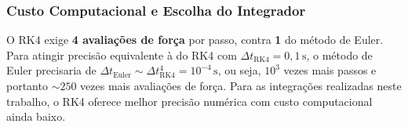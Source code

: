 \subsubsection{Custo Computacional e Escolha do Integrador}

O RK4 exige \textbf{4 avaliações de força} por passo, contra \textbf{1} do método de Euler. Para atingir precisão equivalente à do RK4 com $\Delta t_\text{RK4} = 0{,}1\,\text{s}$, o método de Euler precisaria de $\Delta t_\text{Euler} \sim \Delta t_\text{RK4}^4 = 10^{-4}\,\text{s}$, ou seja, $10^3$ vezes mais passos e portanto $\sim 250$ vezes mais avaliações de força. Para as integrações realizadas neste trabalho, o RK4 oferece melhor precisão numérica com custo computacional ainda baixo.
